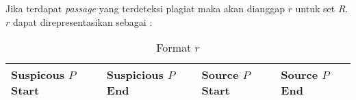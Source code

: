 \documentclass[../Proposal.tex]{subfiles}
\begin{document}
		\noindent Jika terdapat \textit{passage} yang terdeteksi plagiat maka akan dianggap $r$ untuk set $R$. $r$ dapat direpresentasikan sebagai : 
		
		\begin{center}
			\begin{table}[H]
				\centering
				\caption{Format $r$}
				\label{my-label}
				\begin{tabular}{|l|l|l|l|}
					\hline
					Suspicous $P$ Start & Suspicious $P$ End & Source $P$ Start & Source $P$ End \\ \hline
				\end{tabular}
			\end{table}	
		\end{center}
	
\end{document}
